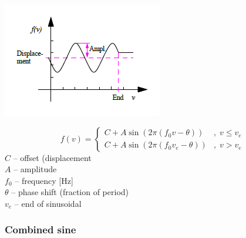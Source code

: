 \noindent
\begin{minipage}{0.45\textwidth}
  \includegraphics[width=\textwidth]{Figures/4-Functions-sine}
\end{minipage}%
\begin{minipage}{0.55\textwidth}
  $$
    f(v)=\left\{\begin{array}{ll}
      C+A\sin(2\pi(f_0v-\theta))   &,\; v \leq v_e \\
      C+A\sin(2\pi(f_0v_e-\theta)) &,\; v > v_e
    \end{array}\right.
  $$
  $C$ -- offset (displacement \\
  $A$ -- amplitude \\
  $f_0$ -- frequency [Hz] \\
  $\theta$ -- phase shift (fraction of period) \\
  $v_e$ -- end of sinusoidal
\end{minipage}


\subsubsection{Combined sine}


